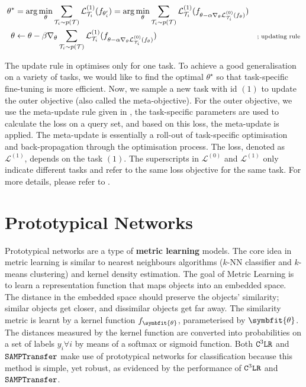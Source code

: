 \begin{equation}
    \begin{aligned}
            \theta^* 
            &= \arg\min_\theta \sum_{\mathcal{T}_i \sim p(\mathcal{T})} \mathcal{L}_{\mathcal{T}_i}^{(1)} (f_{\theta'_i}) = \arg\min_\theta \sum_{\mathcal{T}_i \sim p(\mathcal{T})} \mathcal{L}_{\mathcal{T}_i}^{(1)} (f_{\theta - \alpha\nabla_\theta \mathcal{L}_{\mathcal{T}_i}^{(0)}(f_\theta)}) & \\
            \theta &\leftarrow \theta - \beta \nabla_{\theta} \sum_{\mathcal{T}_i \sim p(\mathcal{T})} \mathcal{L}_{\mathcal{T}_i}^{(1)} (f_{\theta - \alpha\nabla_\theta \mathcal{L}_{\mathcal{T}_i}^{(0)}(f_\theta)}) & \scriptstyle{\text{; updating rule}}
    \end{aligned}
    \label{eqn:maml-update-rule}
\end{equation}

The update rule in  optimises only for one task. To achieve a good generalisation on a variety of tasks, we would like to find the optimal $\theta^\star$ so that task-specific fine-tuning is more efficient.
Now, we sample a new task with id $(1)$ to update the outer objective (also called the meta-objective).
For the outer objective, we use the meta-update rule given in , the task-specific parameters are used to calculate the loss on a query set, and based on this loss, the meta-update is applied. The meta-update is essentially a roll-out of task-specific optimisation and back-propagation through the optimisation process.
The loss, denoted as $\mathcal{L}^{(1)}$, depends on the task $(1)$. The superscripts in $\mathcal{L}^{(0)}$ and $\mathcal{L}^{(1)}$ only indicate different tasks and refer to the same loss objective for the same task.
For more details, please refer to \parencite{Finn2017Model-agnosticNetworks}.


\section{Prototypical Networks}\label{ssec:protonets}

Prototypical networks are a type of \textbf{metric learning} models. The core idea in metric learning is similar to nearest neighbours algorithms ($k$-NN classifier and $k$-means clustering) and kernel density estimation. The goal of Metric Learning is to learn a representation function that maps objects into an embedded space. The distance in the embedded space should preserve the objects' similarity; similar objects get closer, and dissimilar objects get far away. The similarity metric is learnt by a kernel function $f_{\symbfit{\theta}}$, parameterised by $\symbfit{\theta}$. The distances measured by the kernel function are converted into probabilities on a set of labels $y_i \forall i$ by means of a softmax or sigmoid function. Both $\texttt{C$^3$LR}$ and $\texttt{SAMPTransfer}$ make use of prototypical networks for classification because this method is simple, yet robust, as evidenced by the performance of $\texttt{C$^3$LR}$ and $\texttt{SAMPTransfer}$.

